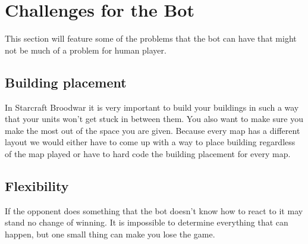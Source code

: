\section{Challenges for the Bot}
	This section will feature some of the problems that the bot can have that might not be much of a problem for human player.
	\subsection*{Building placement}
		In Starcraft Broodwar it is very important to build your buildings in such a 
		way that your units won't get stuck in between  them. You also want to make sure you make the most out of the space you are given. Because every map has
		a different layout we would either have to come up with a way to place building regardless of the map played or have to hard code the building 
		placement for every map.
	
	\subsection*{Flexibility}
		If the opponent does something that the bot doesn't know how to react to it may stand no change of winning. 
		It is impossible to determine everything that can happen, but one small thing can make you lose the game. 